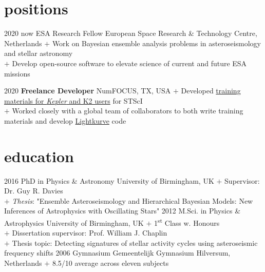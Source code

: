 \documentclass[letterpaper]{k-cv} %
\begin{document}
\section{\color{c1}positions}
\begin{entrylist}
	\entry
	{2020 \to now}
	{ESA Research Fellow}
	{European Space Research \& Technology Centre, Netherlands}
	{$+$ Work on Bayesian ensemble analysis problems in asteroseismology and stellar astronomy\\
		$+$ Develop open-source software to elevate science of current and future ESA missions}
	
	\entry
	{2020}
	{\textbf{Freelance Developer}}
	{NumFOCUS, TX, USA}
	{$+$ Developed \href{https://github.com/spacetelescope/notebooks/blob/master/notebooks/MAST/Kepler/README.md}{training materials for \emph{Kepler} and K2 users} for STScI\\
		$+$ Worked closely with a global team of collaborators to both write training materials and develop \href{https://github.com/lightkurve/lightkurve}{Lightkurve} code}
\end{entrylist}

\section{\color{c1}education}

\begin{entrylist}
	
	\entry
	{2016 }
	{PhD {\bodyfont in Physics \& Astronomy}}
	{University of Birmingham, UK}
	{$+$ Supervisor: Dr. Guy R. Davies\\
		$+$ \textit{Thesis}: "Ensemble Asteroseismology and Hierarchical Bayesian Models: New Inferences of Astrophysics with Oscillating Stars"} 
	\entry
	{2012 }
	{M.Sci. {\bodyfont in Physics \& Astrophysics}}
	{University of Birmingham, UK}
	{$+$ 1\textsuperscript{st} Class w. Honours\\ 
		$+$ Dissertation supervisor: Prof. William J. Chaplin\\
		$+$ Thesis topic: Detecting signatures of stellar activity cycles using asteroseismic frequency shifts}
	\entry
	{2006 }
	{Gymnasium}
	{Gemeentelijk Gymnasium Hilversum, Netherlands}
	{$+$ 8.5/10 average across eleven subjects}
\end{entrylist}
\end{document}
